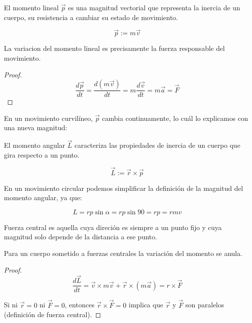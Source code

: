 \documentclass[10pt]{article}
\begin{document}
\begin{definition}
  El momento lineal $ \vec{p} $ es una magnitud vectorial que representa la inercia de un cuerpo, su resistencia a cambiar su estado de movimiento.
  
  $$ \vec{p} := m \vec{v} $$
\end{definition}

\begin{theorem}
  La variacion del momento lineal es precisamente la fuerza responsable del movimiento.
\end{theorem}

\begin{proof}
  $$ \frac{d \vec{p}}{dt} = \frac{d(m \vec{v})}{dt} = m \frac{d \vec{v}}{dt} = m \vec{a} = \vec{F} $$
\end{proof}

En un movimiento curvilíneo, $ \vec{p} $ cambia continuamente, lo cuál lo explicamos con una nueva magnitud:

\begin{definition}
  El momento angular $ \vec{L} $ caracteriza las propiedades de inercia de un cuerpo que gira respecto a un punto.
  
  $$ \vec{L} := \vec{r} \times \vec{p} $$
\end{definition}

En un movimiento circular podemos simplificar la definición de la magnitud del momento angular, ya que:

$$ L = r p \sin{\alpha} = r p \sin{90} = r p = r m v $$

\begin{definition}
  Fuerza central es aquella cuya direción es siempre a un punto fijo y cuya magnitud solo depende de la distancia a ese punto.
\end{definition}

\begin{theorem}
  Para un cuerpo sometido a fuerzas centrales la variación del momento se anula.
\end{theorem}

\begin{proof}
  $$ \frac{d \vec{L}}{dt} = \vec{v} \times m \vec{v} + \vec{r} \times (m \vec{a}) = r \times \vec{F} $$

  Si ni $ \vec{r} = 0 $ ni $ \vec{F} = 0 $, entonces $ \vec{r} \times \vec{F} = 0 $  implica que $ \vec{r} $ y $ \vec{F} $ son paralelos (definición de fuerza central).
\end{proof}
\end{document}
